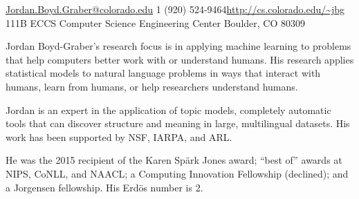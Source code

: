 \documentclass[10pt,a4paper]{article} %
\begin{document}


\noindent\href{mailto:Jordan.Boyd.Graber@colorado.edu}{Jordan.Boyd.Graber@colorado.edu}\bull %
\textsmaller{+}1 (920) 524-9464\bull \href{http://cs.colorado.edu/~jbg}{\url{http://cs.colorado.edu/~jbg}}\\ %
111B ECCS \bull Computer Science \bull Engineering Center \bull Boulder, CO 80309

\spacedhrule{0.9em}{-0.4em} %



\vspace{-1.3em} %

\begin{multicols}{2}  %

Jordan Boyd-Graber's research focus is in applying machine learning
to problems that help computers better
work with or understand humans.  His research
applies statistical models to natural language problems in ways that
interact with humans, learn from humans, or help researchers
understand humans.

Jordan is an expert in the application of topic models, completely automatic
tools that can discover structure and meaning in large, multilingual
datasets. His work has been supported by NSF, IARPA, and ARL.

He was the 2015 recipient of the Karen Sp\"ark Jones award; ``best of'' awards at
NIPS, CoNLL, and NAACL; a Computing Innovation Fellowship (declined); and a
Jorgensen fellowship.  His Erd\"os number is 2.

\end{multicols}

\spacedhrule{0.5em}{-0.4em} %
\end{document}
